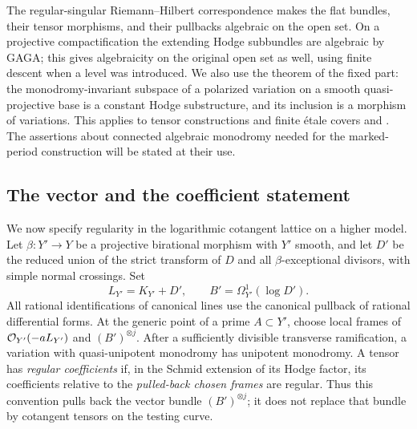 The regular-singular Riemann--Hilbert correspondence
\cite[Chapter II, \S\S5--6]{DeligneRSE} makes the flat bundles, their
tensor morphisms, and their pullbacks algebraic on the open set.  On a
projective compactification the extending Hodge subbundles are algebraic
by GAGA; this gives algebraicity on the original open set as well, using
finite descent when a level was introduced.  We also use the theorem of
the fixed part: the monodromy-invariant subspace of a polarized variation
on a smooth quasi-projective base is a constant Hodge substructure, and
its inclusion is a morphism of variations.  This applies to tensor
constructions and finite étale covers
\cite[\S4.1]{DeligneHodgeII} and \cite[(7.22)]{Schmid}.
The assertions about connected algebraic
monodromy needed for the marked-period construction will be stated at
their use.

\subsection{The vector and the coefficient statement}
We now specify regularity in the logarithmic cotangent lattice on a
higher model.
Let $\beta:Y'\to Y$ be a projective birational morphism with $Y'$ smooth,
and let $D'$ be the reduced union of the strict transform of $D$ and all
$\beta$-exceptional divisors, with simple normal crossings.  Set
\[
 L_{Y'}=K_{Y'}+D',\qquad B'=\Omega^1_{Y'}(\log D').
\]
All rational identifications of canonical lines use the canonical
pullback of rational differential forms.  At the generic point of a
prime $A\subset Y'$, choose local frames of $\mathcal O_{Y'}(-aL_{Y'})$ and
$(B')^{\otimes j}$.  After a sufficiently divisible transverse
ramification, a variation with quasi-unipotent monodromy has unipotent
monodromy.  A tensor has \emph{regular coefficients} if, in the
Schmid extension of its Hodge factor, its coefficients relative to the
\emph{pulled-back chosen frames} are regular.  Thus this convention
pulls back the vector bundle $(B')^{\otimes j}$; it does not replace
that bundle by cotangent tensors on the testing curve.

